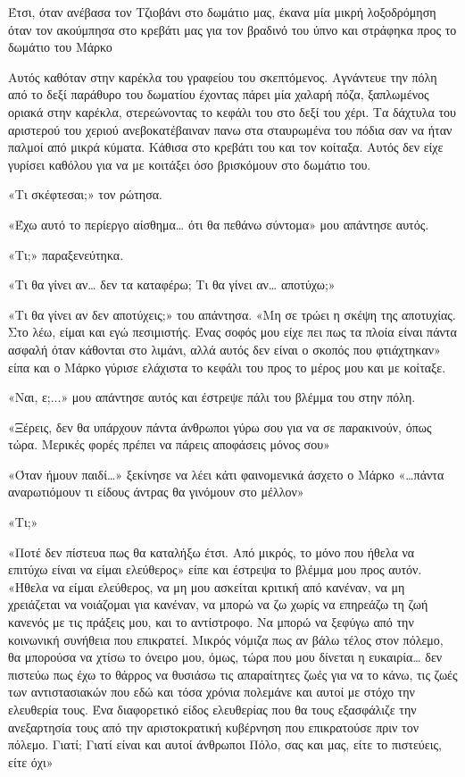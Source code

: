 \documentclass[12pt,twoside, openany]{book}
\begin{document}
Έτσι, όταν ανέβασα τον Τζιοβάνι στο δωμάτιο μας, έκανα μία μικρή λοξοδρόμηση όταν τον ακούμπησα στο κρεβάτι μας για τον βραδινό του ύπνο και στράφηκα προς το δωμάτιο του Μάρκο

Αυτός καθόταν στην καρέκλα του γραφείου του σκεπτόμενος. Αγνάντευε την πόλη από το δεξί παράθυρο του δωματίου έχοντας πάρει μία χαλαρή πόζα, ξαπλωμένος οριακά στην καρέκλα, στερεώνοντας το κεφάλι του στο δεξί του χέρι. Τα δάχτυλα του αριστερού του χεριού ανεβοκατέβαιναν πανω στα σταυρωμένα του πόδια σαν να ήταν παλμοί από μικρά κύματα. Κάθισα στο κρεβάτι του και τον κοίταξα. Αυτός δεν είχε γυρίσει καθόλου για να με κοιτάξει όσο βρισκόμουν στο δωμάτιο του.

«Τι σκέφτεσαι;» τον ρώτησα.

«Έχω αυτό το περίεργο αίσθημα… ότι θα πεθάνω σύντομα» μου απάντησε αυτός.

«Τι;» παραξενεύτηκα.

«Τι θα γίνει αν… δεν τα καταφέρω; Τι θα γίνει αν… αποτύχω;»

«Τι θα γίνει αν δεν αποτύχεις;» του απάντησα. «Μη σε τρώει η σκέψη της αποτυχίας. Στο λέω, είμαι και εγώ πεσιμιστής. Ένας σοφός μου είχε πει πως τα πλοία είναι πάντα ασφαλή όταν κάθονται στο λιμάνι, αλλά αυτός δεν είναι ο σκοπός που φτιάχτηκαν» είπα και ο Μάρκο γύρισε ελάχιστα το κεφάλι του προς το μέρος μου και με κοίταξε.

«Ναι, ε;...» μου απάντησε αυτός και έστρεψε πάλι του βλέμμα του στην πόλη.

«Ξέρεις, δεν θα υπάρχουν πάντα άνθρωποι γύρω σου για να σε παρακινούν, όπως τώρα. Μερικές φορές πρέπει να πάρεις αποφάσεις μόνος σου»

«Όταν ήμουν παιδί…» ξεκίνησε να λέει κάτι φαινομενικά άσχετο ο Μάρκο «…πάντα αναρωτιόμουν τι είδους άντρας θα γινόμουν στο μέλλον»

«Τι;»

«Ποτέ δεν πίστευα πως θα καταλήξω έτσι. Από μικρός, το μόνο που ήθελα να επιτύχω είναι να είμαι ελεύθερος» είπε και έστρεψα το βλέμμα μου προς αυτόν. «Ήθελα να είμαι ελεύθερος, να μη μου ασκείται κριτική από κανέναν, να μη χρειάζεται να νοιάζομαι για κανέναν, να μπορώ να ζω χωρίς να επηρεάζω τη ζωή κανενός με τις πράξεις μου, και το αντίστροφο. Να μπορώ να ξεφύγω από την κοινωνική συνήθεια που επικρατεί. Μικρός νόμιζα πως αν βάλω τέλος στον πόλεμο, θα μπορούσα να χτίσω το όνειρο μου, όμως, τώρα που μου δίνεται η ευκαιρία… δεν πιστεύω πως έχω το θάρρος να θυσιάσω τις απαραίτητες ζωές για να το κάνω, τις ζωές των αντιστασιακών που εδώ και τόσα χρόνια πολεμάνε και αυτοί με στόχο την ελευθερία τους. Ένα διαφορετικό είδος ελευθερίας που θα τους εξασφάλιζε την ανεξαρτησία τους από την αριστοκρατική κυβέρνηση που επικρατούσε πριν τον πόλεμο. Γιατί; Γιατί είναι και αυτοί άνθρωποι Πόλο, σας και μας, είτε το πιστεύεις, είτε όχι»
\end{document}
